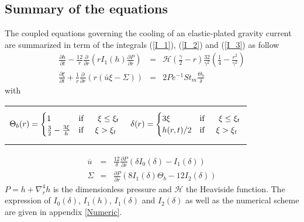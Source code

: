   \subsection{Summary of the equations}
  \label{sec:summary-equations}

  The  coupled equations  governing the  cooling of  an elastic-plated
  gravity current are summarized in term of the integrals (\ref{I_1}),
  (\ref{I_2}) and (\ref{I_3}) as follow
  \begin{eqnarray}
    \frac{\partial h}{\partial t}-\frac{12}{r}
    \frac{\partial}{\partial      r}
    \left( r I_1(h) \frac{\partial P}{\partial
    r}\right)
    \label{C3-HF}
    & =& \mathcal{H}(\frac{\gamma}{2}-r)\frac{32}{\gamma^{2}}\left(\frac{1}{4}-\frac{r^{2}}{\gamma^{2}}\right)\\
    \frac{\partial                                       \xi}{\partial
    t}+\frac{1}{r}\frac{\partial}{\partial                          r}
    \left( r\left(\bar{u}\xi-\Sigma\right)\right)&=&2Pe^{-1}St_m\frac{\Theta_b}{\delta}\label{C3-TF}
  \end{eqnarray}
  with

\begin{tabular}{p{6cm}p{6cm}}
{
\begin{equation}
    \Theta_b(r)=
    \begin{cases}
      1 &\text{if } \hspace{.5cm} \xi\leq \xi_t \nonumber\\
      \frac{3}{2}-\frac{3\xi}{h} & \text{if} \hspace{.5cm} \xi > \xi_t\nonumber
    \end{cases}
  \end{equation}
                                   }
&
{
  \begin{equation}
    \delta(r)=
    \begin{cases}
      3\xi &\text{if } \hspace{.5cm} \xi\leq \xi_t\\
      h(r,t)/2 & \text{if} \hspace{.5cm} \xi > \xi_t\nonumber\\
    \end{cases}
  \end{equation}
  }
\end{tabular}
\begin{eqnarray}
  \overline{u}&=& \frac{12}{\delta}\frac{\partial P}{\partial r}\left(\delta
                  I_0(\delta)-I_1(\delta)\right) \label{ubarF}\\
  \Sigma     &=& \frac{\partial     P}{\partial
                 r}\left(8I_1(\delta)\Theta_b-12I_2(\delta)\right)\label{SigmaF}
\end{eqnarray}
$P =  h+\nabla_r^4h$ is  the dimensionless pressure  and $\mathcal{H}$
the Heaviside function. The expression of
$I_0(\delta)$, $I_1(h)$,  $I_1(\delta)$ and  $I_2(\delta)$ as  well as
the numerical scheme are given in appendix \ref{Numeric}.

